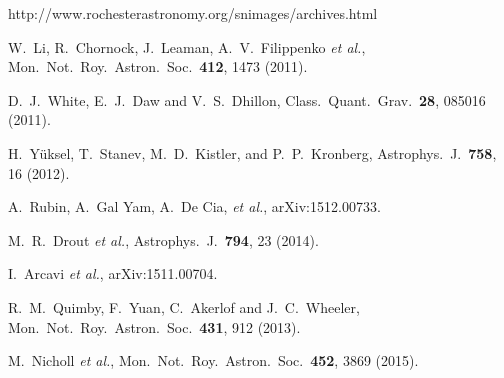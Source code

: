 \documentclass[aps,prd,nofootinbib,twocolumn,floatfix,letterpaper,superscriptaddress,showpacs]{revtex4}
\begin{document}
\begin{thebibliography}{99}
  http://www.rochesterastronomy.org/snimages/archives.html

  W.~Li, R.~Chornock, J.~Leaman, A.~V.~Filippenko {\it et al.},
  Mon.\ Not.\ Roy.\ Astron.\ Soc.\ {\bf 412}, 1473 (2011).

  D.~J.~White, E.~J.~Daw and V.~S.~Dhillon,
  Class.\ Quant.\ Grav.\  {\bf 28}, 085016 (2011).



  H.\ Y{\"u}ksel, T.\ Stanev, M.~D.\ Kistler, and P.~P.\ Kronberg,
  Astrophys.\ J.\  {\bf 758}, 16 (2012).




  A.~Rubin, A.~Gal Yam, A.~De Cia, {\it et al.},
  arXiv:1512.00733.



  M.~R.~Drout {\it et al.},
  Astrophys.\ J.\  {\bf 794}, 23 (2014).

  I.~Arcavi {\it et al.},
  arXiv:1511.00704.


  R.~M.~Quimby, F.~Yuan, C.~Akerlof and J.~C.~Wheeler,
  Mon.\ Not.\ Roy.\ Astron.\ Soc.\  {\bf 431}, 912 (2013).

  M.~Nicholl {\it et al.},
  Mon.\ Not.\ Roy.\ Astron.\ Soc.\  {\bf 452}, 3869 (2015).



\end{thebibliography}
\end{document}
